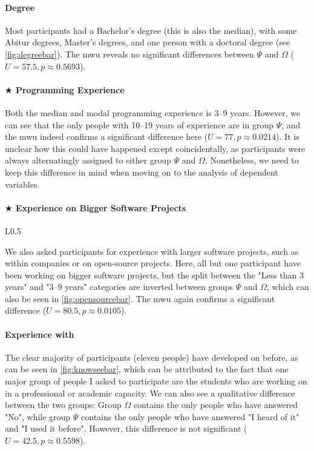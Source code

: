 \documentclass[../thesis]{subfiles}
\begin{document}
\paragraph{Degree}
Most participants had a Bachelor's degree (this is also the median), with some Abitur degrees, Master's degrees, and one person with a doctoral degree (see \cref{fig:degreebar}).
The \gls{mwu} reveals no significant differences between $\Psi$ and $\Omega$ ($U = 57.5, p \approx 0.5693$).

\paragraph{$\bigstar$ Programming Experience}
Both the median and modal programming experience is 3--9 years.
However, we can see that the only people with 10--19 years of experience are in group $\Psi$, and the \gls{mwu} indeed confirms a significant difference here ($U = 77, p \approx 0.0214$).
It is unclear how this could have happened except coincidentally, as participants were always alternatingly assigned to either group $\Psi$ and $\Omega$.
Nonetheless, we need to keep this difference in mind when moving on to the analysis of dependent variables.

\paragraph{$\bigstar$ Experience on Bigger Software Projects}

\begin{wrapfigure}{L}{0.5\textwidth}
	\centering
	\caption{"How long have you been programming on bigger software projects (\eg, within a company, or open-source projects)?"}\label{fig:opensourcebar}
\end{wrapfigure}

We also asked participants for experience with larger software projects, such as within companies or on open-source projects.
Here, all but one participant have been working on bigger software projects, but the split between the "Less than 3 years" and "3--9 years" categories are inverted between groups $\Psi$ and $\Omega$, which can also be seen in \cref{fig:opensourcebar}.
The \gls{mwu} again confirms a significant difference ($U = 80.5, p \approx 0.0105$).

\paragraph{Experience with \SEE{}}
The clear majority of participants (eleven people) have developed on \SEE{} before, as can be seen in \cref{fig:knowseebar}, which can be attributed to the fact that one major group of people I asked to participate are the students who are working on \SEE{} in a professional or academic capacity.
We can also see a qualitative difference between the two groups:
Group $\Omega$ contains the only people who have answered "No", while group $\Psi$ contains the only people who have answered "I heard of it" and "I used it before".
However, this difference is not significant ($U = 42.5, p \approx 0.5598$).
\end{document}
